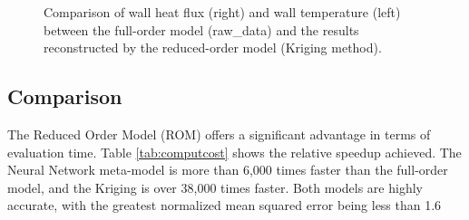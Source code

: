 \documentclass[10pt,fleqn,a4paper,twoside]{article}
\begin{document}
\begin{figure}[!ht]%
    \centering
    \qquad
    \caption{Comparison of wall heat flux (right) and wall temperature (left) between the full-order model (raw\_data) and the results reconstructed by the reduced-order model (Kriging method).}
    \label{fig:krigingwall}%
\end{figure}

\subsection{Comparison}

The Reduced Order Model (ROM) offers a significant advantage in terms of evaluation time. Table \ref{tab:computcost} shows the relative speedup achieved. The Neural Network meta-model is more than 6,000 times faster than the full-order model, and the Kriging is over 38,000 times faster. Both models are highly accurate, with the greatest normalized mean squared error being less than 1.6%
\end{document}
